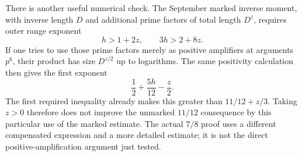 There is another useful numerical check. The September marked
inverse moment, with inverse length $D$ and additional prime factors
of total length $D^z$, requires outer range exponent
\[
 h>1+2z,\qquad 3h>2+8z.
\]
If one tries to use those prime factors merely as positive
amplifiers at arguments $p^6$, their product has size
$D^{z/2}$ up to logarithms. The same positivity calculation
then gives the first exponent
\[
 \frac12+\frac{5h}{12}-\frac z2.
\]
The first required inequality already makes this greater than
$11/12+z/3$. Taking $z>0$ therefore does not improve the
unmarked $11/12$ consequence by this particular use of the
marked estimate. The actual $7/8$ proof uses a different
compensated expression and a more detailed estimate; it is
not the direct positive-amplification argument just tested.


